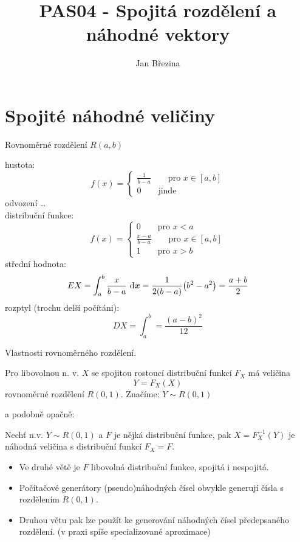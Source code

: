 \documentclass[smaller]{beamer}
\title{PAS04 - Spojitá rozdělení a náhodné vektory}
\author{Jan B\v rezina}
\institute %
{
  Technical University of Liberec
}
\def\d{\,{\rm d}}               %
\def\vc#1{\mathbf{\boldsymbol{#1}}}     %
\def\vx{\vc{x}}
\def\dx{\,\d\vx}
\begin{document}
\begin{frame}
  \titlepage
\end{frame}

\def\df{\usebeamercolor[fg]{my red}\it}

\section{Spojité náhodné veličiny}
\begin{frame}{Rovnoměrné rozdělení $R(a,b)$}

hustota: 
\[f(x) = \left\{
   \begin{array}{l}
    \frac{1}{b-a}  \qquad \text{pro }x\in[a,b]\\
     0 \qquad \text{jinde}
   \end{array}
\right.
\]
odvození \dots\\

distribuční funkce: 
\[f(x) = \left\{
   \begin{array}{l}
    0 \qquad \text{pro } x< a\\
    \frac{x-a}{b-a}  \qquad \text{pro }x\in[a,b]\\
     1 \qquad \text{pro } x> b
   \end{array}
\right.
\]
střední hodnota:
\[
 EX = \int_a^b \frac{x}{b-a} \dx = \frac{1}{2(b-a)} \big(b^2 - a^2\big) = \frac{a+b}{2}
\]
rozptyl (trochu delší počítáni):
\[
 DX = \int_a^b =\frac{(a-b)^2}{12}
\]
\end{frame}

\begin{frame}{Vlastnosti rovnoměrného rozdělení.}
\begin{theorem}
Pro libovolnou n. v. $X$ se spojitou rostoucí distribuční funkcí $F_X$ má veličina 
\[
  Y=F_X(X)
\]
rovnoměrné rozdělení $R(0,1)$. Značíme: $Y \sim R(0,1)$
\end{theorem}
a podobně opačně:
\begin{theorem}
Nechť n.v. $Y \sim R(0,1)$ a $F$ je nějká distribuční funkce, pak $X = F_X^{-1}(Y)$ je náhodná veličina s distribuční funkcí $F_X=F$.
\end{theorem}
\begin{itemize}
\item Ve druhé větě je $F$ libovolná distribuční funkce, spojitá i nespojitá. 
\item Počítačové generátory (pseudo)náhodných čísel obvykle generují čísla s rozdělením $R(0,1)$.
\item Druhou větu pak lze použít ke generování náhodných čísel předepsaného rozdělení. (v praxi spíše specializované aproximace)
\end{itemize}

\end{frame}
\end{document}
